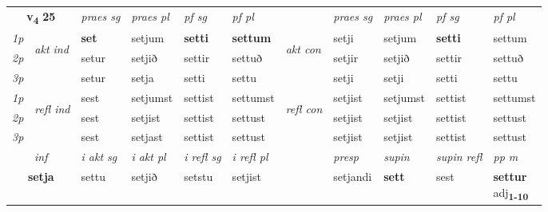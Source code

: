 \noindent
\begin{tabular}{lllllllllll} \toprule
\multicolumn{2}{c}{\textbf{v{\textsubscript{4}}} \Large{\textbf{25}}}  &  \textit{praes sg}  & \textit{praes pl}  &\textit{ pf sg} & \textit{pf pl} &  &  \textit{praes sg}  & \textit{praes pl}  & \textit{pf sg} & \textit{pf pl } \\*
	\cmidrule{3-6} \cmidrule{8-11}
 {\textit{1p}} & \multirow{3}{*}{\begin{turn}{90}\textit{akt ind}\end{turn}} & \textbf{set} & setjum & \textbf{setti} & \textbf{settum} & \multirow{3}{*}{\begin{turn}{90}\textit{akt con}\end{turn}} &setji & setjum & \textbf{setti} & settum\\*
 {\textit{2p}} &  &  setur  & setjið & settir & settuð & & setjir & setjið & settir & settuð \\*
{\textit{3p}} &  & setur & setja & setti & settu & & setji & setji& setti & settu \\*
\cmidrule{3-6} \cmidrule{8-11}
 {\textit{1p}} & \multirow{3}{*}{\begin{turn}{90}\textit{refl ind}\end{turn}}  & sest & setjumst & settist & settumst & \multirow{3}{*}{\begin{turn}{90}\textit{refl con}\end{turn}}  &setjist & setjumst & settist & settumst \\*
 {\textit{2p}} &  & sest & setjist & settist & settust & &setjist & setjist & settist & settust \\*
 {\textit{3p}}  & & sest & setjast & settist & settust & & setjist & setjist& settist & settust \\*
\cmidrule{3-6} \cmidrule{8-11}

   \multicolumn{2}{c}{\textit{inf}}  & \textit{i akt sg} & \textit{i akt pl} & \textit{i refl sg} & \textit{i refl pl} && \textit{presp} & \textit{supin} & \textit{supin refl} & \textit{pp m} \\*
  \multicolumn{2}{c}{\textbf{setja}} & settu  & setjið & setstu & setjist && setjandi &  \textbf{sett} & sest & \specialcell{\textbf{settur} \\ adj\textbf{\textsubscript{1-10}}} \\*
\end{tabular}

